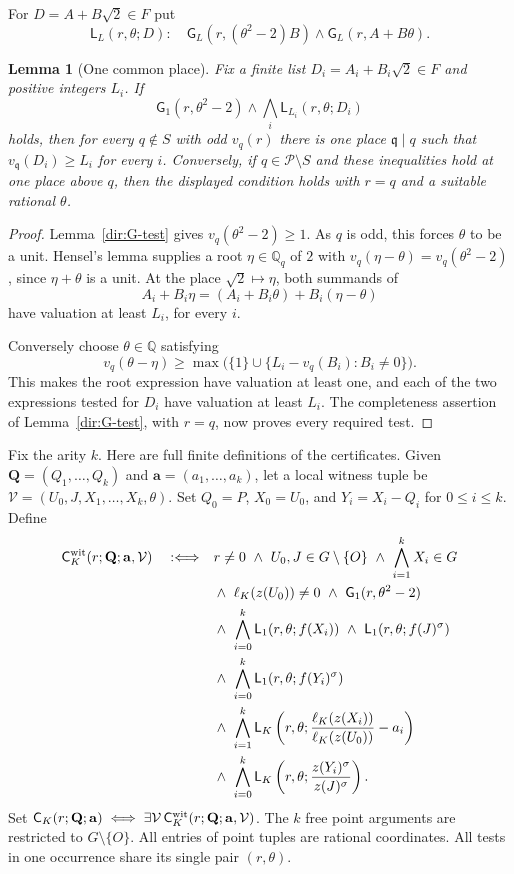 \documentclass[11pt]{article}
\newtheorem{lemma}[theorem]{Lemma}
\theoremstyle{definition}\newtheorem{inputthm}[theorem]{Hypothesis}
\theoremstyle{remark}\newtheorem{remark}[theorem]{Remark}
\newcommand{\Q}{\mathbb Q}\newcommand{\Z}{\mathbb Z}
\begin{document}
For $D=A+B\sqrt2\in F$ put
\[
 \mathsf L_L(r,\theta;D):\quad
 \mathsf G_L(r,(\theta^2-2)B)\land
 \mathsf G_L(r,A+B\theta).
\]
\begin{lemma}[One common place]\label{dir:common-place}
Fix a finite list $D_i=A_i+B_i\sqrt2\in F$ and positive integers
$L_i$. If
\[
 \mathsf G_1(r,\theta^2-2)\land
 \bigwedge_i\mathsf L_{L_i}(r,\theta;D_i)
\]
holds, then for every $q\notin S$ with odd $v_q(r)$ there is
one place $\mathfrak q\mid q$ such that
$v_{\mathfrak q}(D_i)\ge L_i$ for every $i$.
Conversely, if $q\in\mathscr P\setminus S$ and these inequalities hold
at one place above $q$, then the displayed condition holds with
$r=q$ and a suitable rational $\theta$.
\end{lemma}
\begin{proof}
Lemma~\ref{dir:G-test} gives $v_q(\theta^2-2)\ge1$. As $q$ is
odd, this forces $\theta$ to be a unit. Hensel's lemma supplies
a root $\eta\in\Q_q$ of $2$ with
$v_q(\eta-\theta)=v_q(\theta^2-2)$, since $\eta+\theta$ is a
unit. At the place $\sqrt2\mapsto\eta$, both summands of
\[
 A_i+B_i\eta=(A_i+B_i\theta)+B_i(\eta-\theta)
\]
have valuation at least $L_i$, for every $i$.

Conversely choose $\theta\in\Q$ satisfying
\[
 v_q(\theta-\eta)\ge
 \max\bigl(\{1\}\cup\{L_i-v_q(B_i):B_i\ne0\}\bigr).
\]
This makes the root expression have valuation at least one, and
each of the two expressions tested for $D_i$ have valuation at
least $L_i$. The completeness assertion of Lemma~\ref{dir:G-test},
with $r=q$, now proves every required test.
\end{proof}

Fix the arity $k$. Here are full finite definitions of the certificates. Given
$\mathbf Q=(Q_1,\ldots,Q_k)$ and $\mathbf a=(a_1,\ldots,a_k)$,
let a local witness tuple be
$\mathcal V=(U_0,J,X_1,\ldots,X_k,\theta)$. Set
$Q_0=P$, $X_0=U_0$, and $Y_i=X_i-Q_i$ for $0\le i\le k$.
Define
\begin{equation}\label{dir:C-wit}
\begin{split}
 \mathsf C_K^{\rm wit}(r;\mathbf Q;\mathbf a,\mathcal V)
 \quad:\Longleftrightarrow\quad&
 r\ne0\ \land\ U_0,J\in G\setminus\{O\}
 \ \land\ \bigwedge_{i=1}^kX_i\in G\\
 &\land\ \ell_K(z(U_0))\ne0
 \ \land\ \mathsf G_1(r,\theta^2-2)\\
 &\land\ \bigwedge_{i=0}^k\mathsf L_1(r,\theta;f(X_i))
 \ \land\ \mathsf L_1(r,\theta;f(J)^\sigma)\\
 &\land\ \bigwedge_{i=0}^k\mathsf L_1(r,\theta;f(Y_i)^\sigma)\\
 &\land\ \bigwedge_{i=1}^k
 \mathsf L_K\left(r,\theta;
 \frac{\ell_K(z(X_i))}{\ell_K(z(U_0))}-a_i\right)\\
 &\land\ \bigwedge_{i=0}^k
 \mathsf L_K\left(r,\theta;
 \frac{z(Y_i)^\sigma}{z(J)^\sigma}\right).
\end{split}
\end{equation}
Set $\mathsf C_K(r;\mathbf Q;\mathbf a)\iff
\exists\mathcal V\,\mathsf C_K^{\rm wit}(r;\mathbf Q;\mathbf a,\mathcal V)$.
The $k$ free point arguments are restricted to $G\setminus\{O\}$.
All entries of point tuples are rational coordinates. All tests in one
occurrence share its single pair $(r,\theta)$.
\end{document}
